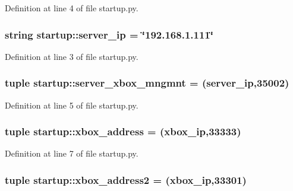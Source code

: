 Definition at line 4 of file startup.py.

\hypertarget{namespacestartup_aa894c917d5068207aa437548b4a4c128}{
\subsubsection[{server\_\-ip}]{\setlength{\rightskip}{0pt plus 5cm}string {\bf startup::server\_\-ip} = \char`\"{}192.168.1.111\char`\"{}}}
\label{namespacestartup_aa894c917d5068207aa437548b4a4c128}


Definition at line 3 of file startup.py.

\hypertarget{namespacestartup_ad1c8e482bc18c5257ed10d7c72f1795d}{
\subsubsection[{server\_\-xbox\_\-mngmnt}]{\setlength{\rightskip}{0pt plus 5cm}tuple {\bf startup::server\_\-xbox\_\-mngmnt} = ({\bf server\_\-ip},35002)}}
\label{namespacestartup_ad1c8e482bc18c5257ed10d7c72f1795d}


Definition at line 5 of file startup.py.

\hypertarget{namespacestartup_a3d33dc079a2e3e9416b61d7a0d489076}{
\subsubsection[{xbox\_\-address}]{\setlength{\rightskip}{0pt plus 5cm}tuple {\bf startup::xbox\_\-address} = ({\bf xbox\_\-ip},33333)}}
\label{namespacestartup_a3d33dc079a2e3e9416b61d7a0d489076}


Definition at line 7 of file startup.py.

\hypertarget{namespacestartup_a0dfd7a53fd6a472fc4b25e66673f4c44}{
\subsubsection[{xbox\_\-address2}]{\setlength{\rightskip}{0pt plus 5cm}tuple {\bf startup::xbox\_\-address2} = ({\bf xbox\_\-ip},33301)}}
\label{namespacestartup_a0dfd7a53fd6a472fc4b25e66673f4c44}



